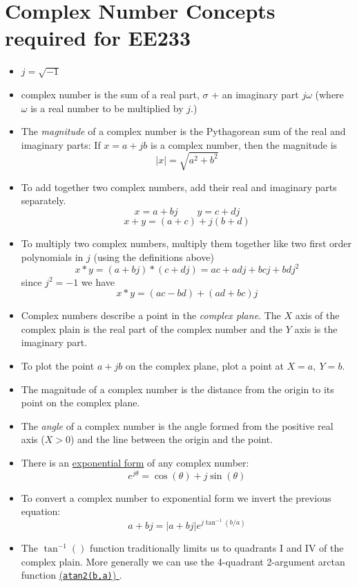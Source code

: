 \section{Complex Number Concepts required for EE233}\label{cnconcepts}
\begin{itemize}
  \item $j = \sqrt{-1}$
  \item complex number is the sum of a real part, $\sigma$ + an imaginary part $j\omega$ (where $\omega$ is a real number to be multiplied by $j$.)
  \item   The {\it magnitude} of a complex number is the Pythagorean sum of the real and imaginary parts:
  If $x= a+jb$ is a complex number, then the magnitude is
  \[
  |x| = \sqrt{a^2+b^2}
  \]
  \item To add together two complex numbers, add their real and imaginary parts separately.
  \[
  x = a+bj \qquad y = c+dj
  \]
  \[
  x + y = (a+c) + j(b+d)
  \]
  \item To multiply two complex numbers, multiply them together like two first order polynomials in $j$ (using the definitions above)
  \[
  x*y = (a+bj)*(c+dj) = ac+adj + bcj+bdj^2
  \]
  since $j^2=-1$ we have
  \[
  x*y = (ac-bd)+(ad+bc)j
  \]

  \item Complex numbers describe a point in the {\it complex plane}.  The $X$ axis of the complex plain is the real part of the complex number and the $Y$ axis is the imaginary part.

  \item To plot the point $a+jb$ on the complex plane, plot a point at $X = a, \: Y = b$.

  \item The magnitude of a complex number is the distance from the origin to its point on the complex plane.

  \item The {\it angle} of a complex number is the angle formed from the positive real axis ($X>0$) and the line between the origin and the point.

  \item There is an \href{http://en.wikipedia.org/wiki/Euler\%27s_formula}{exponential form} of any complex number:
  \[
  e^{j\theta} = \cos(\theta) + j\sin(\theta)
  \]
  \item To convert a complex number to exponential form we invert the previous equation:
  \[
  a+bj = |a+bj| e^{j\tan^{-1}(b/a)}
  \]

  \item The $\tan^{-1}()$ function traditionally limits us to quadrants I and IV of the complex plain.    More generally we can use the 4-quadrant 2-argument arctan function \href{http://en.wikipedia.org/wiki/Atan2}{({\tt atan2(b,a)}) }.


\end{itemize}
